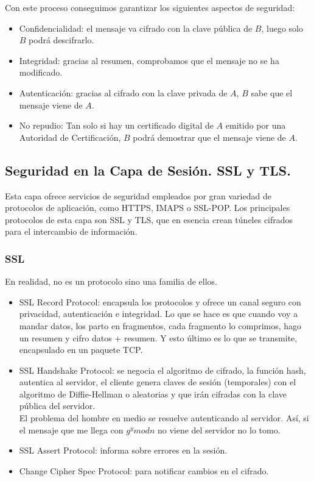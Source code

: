 Con este proceso conseguimos garantizar los siguientes aspectos de seguridad:
\begin{itemize}
    \item Confidencialidad: el mensaje va cifrado con la clave pública de $B$, luego solo $B$ podrá descifrarlo.
    \item Integridad: gracias al resumen, comprobamos que el mensaje no se ha modificado.
    \item Autenticación: gracias al cifrado con la clave privada de $A$, $B$ sabe que el mensaje viene de $A$.
    \item No repudio: Tan solo si hay un certificado digital de $A$ emitido por una Autoridad de Certificación, $B$ podrá demostrar que el mensaje viene de $A$.
\end{itemize}


\subsection{Seguridad en la Capa de Sesión. \acrshort{SSL} y \acrshort{TLS}.}

Esta capa ofrece servicios de seguridad empleados por gran variedad de protocolos de aplicación, como \acrshort{HTTPS}, \acrshort{IMAPS} o \acrshort{SSL}-\acrshort{POP}. Los principales protocolos de esta capa son \acrshort{SSL} y \acrshort{TLS}, que en esencia crean túneles cifrados para el intercambio de información.

\subsubsection{\acrfull{SSL}}
En realidad, no es un protocolo sino una familia de ellos.
\begin{itemize}
    \item SSL Record Protocol: encapsula los protocolos y ofrece un canal seguro con privacidad, autenticación e integridad. Lo que se hace es que cuando voy a mandar datos, los parto en fragmentos, cada fragmento lo comprimos, hago un resumen y cifro datos + resumen. Y esto último es lo que se transmite, encapsulado en un paquete TCP\@.
    \item SSL Handshake Protocol: se negocia el algoritmo de cifrado, la función hash, autentica al servidor, el cliente genera claves de sesión (temporales) con el algoritmo de Diffie-Hellman o aleatorias y que irán cifradas con la clave pública del servidor. \\
        El problema del hombre en medio se resuelve autenticando al servidor. Así, si el mensaje que me llega con $g^ymodn$ no viene del servidor no lo tomo. 
    \item SSL Assert Protocol: informa sobre errores en la sesión.
    \item Change Cipher Spec Protocol: para notificar cambios en el cifrado.
\end{itemize}



